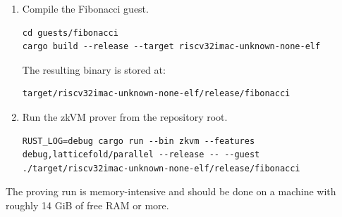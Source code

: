 \begin{enumerate}
	\item Compile the Fibonacci guest.

	      \begin{verbatim}
cd guests/fibonacci
cargo build --release --target riscv32imac-unknown-none-elf
\end{verbatim}

	      The resulting binary is stored at:

	      \begin{verbatim}
target/riscv32imac-unknown-none-elf/release/fibonacci
\end{verbatim}

	\item Run the zkVM prover from the repository root.

	      \begin{verbatim}
RUST_LOG=debug cargo run --bin zkvm --features debug,latticefold/parallel --release -- --guest ./target/riscv32imac-unknown-none-elf/release/fibonacci
\end{verbatim}
\end{enumerate}

The proving run is memory-intensive and should be done on a machine with roughly
14 GiB of free RAM or more.
